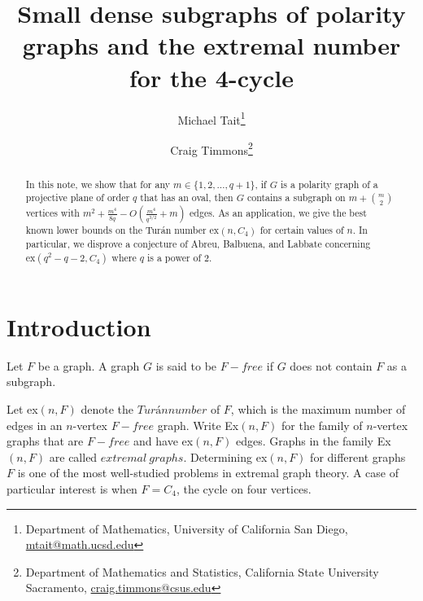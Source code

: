 \documentclass[12pt]{article}
\date{}
\title{Small dense subgraphs of polarity graphs and the extremal number for the 4-cycle}
\author{
    Michael Tait\thanks{Department of Mathematics, University of California San Diego, \url{mtait@math.ucsd.edu}}
    \and
    Craig Timmons\thanks{Department of Mathematics and Statistics, California State University Sacramento, \mbox{\url{craig.timmons@csus.edu}}}
}
\begin{document}
\maketitle

\begin{abstract}
    In this note, we show that for any $m \in \{1,2, \dots , q +1 \}$, if $G$ is a polarity graph of a projective plane of order $q$ that has an oval, then $G$ contains a subgraph on $m + \binom{m}{2}$ vertices with $m^2+\frac{m^4}{8q} - O ( \frac{m^4}{q^{3/2} } +m )$ edges. As an application, we give the best known lower bounds on the Tur\'{a}n number $\mathrm{ex}(n, C_4)$ for certain values of $n$. In particular, we disprove a conjecture of Abreu, Balbuena, and Labbate concerning $\mathrm{ex}(q^2-q-2, C_4)$ where $q$ is a power of $2$.
\end{abstract}

\section{Introduction}

Let $F$ be a graph. A graph $G$ is said to be $F-free$ if $G$ does not contain $F$ as a subgraph.

Let ex$(n, F)$ denote the $Turán number$ of $F$, which is the maximum number of edges
in an $n$-vertex $F-free$ graph. Write Ex$(n, F )$ for the family of $n$-vertex graphs that
are $F-free$ and have ex$(n, F)$ edges. Graphs in the family Ex$(n, F)$ are called $extremal\
    graphs$. Determining ex$(n, F)$ for different graphs $F$ is one of the most well-studied
problems in extremal graph theory. A case of particular interest is when $F = C_4$,
the cycle on four vertices.
\end{document}
